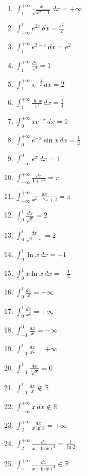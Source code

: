\documentclass[11pt,a4paper]{article}
\begin{document}
\begin{enumerate}
\item $\displaystyle \int_{1}^{+\infty} \frac{x}{\sqrt{x^{2} + 1}} \, dx = +\infty$
\item $\displaystyle \int_{-\infty}^{1} e^{2x} \, dx = \frac{e^{2}}{2}$
\item $\displaystyle \int_{1}^{+\infty} e^{3 - x} \, dx = e^{2}$
\item $\displaystyle \int_{1}^{+\infty} \frac{dx}{x^{2}} = 1$
\item $\displaystyle \int_{1}^{+\infty} x^{-\frac{3}{2}} \, dx = 2$
\item $\displaystyle \int_{1}^{+\infty} \frac{\ln x}{x^{3}} \, dx = \frac{1}{4}$
\item $\displaystyle \int_{0}^{+\infty} x e^{-x} \, dx = 1$
\item $\displaystyle \int_{0}^{+\infty} e^{-x} \sin x \, dx = \frac{1}{2}$
\item $\displaystyle \int_{-\infty}^{0} e^{x} \, dx = 1$
\item $\displaystyle \int_{-\infty}^{+\infty} \frac{dx}{1 + x^{2}} = \pi$
\item $\displaystyle \int_{-\infty}^{+\infty} \frac{dx}{x^{2} + 2x + 2} = \pi$
\item $\displaystyle \int_{0}^{1} \frac{dx}{\sqrt{x}} = 2$
\item $\displaystyle \int_{0}^{1} \frac{dx}{\sqrt{1 - x}} = 2$
\item $\displaystyle \int_{0}^{1} \ln x \, dx = -1$
\item $\displaystyle \int_{0}^{1} x \ln x \, dx = -\frac{1}{4}$
\item $\displaystyle \int_{0}^{1} \frac{dx}{x} = +\infty$
\item $\displaystyle \int_{0}^{1} \frac{dx}{x^{2}} = +\infty$
\item $\displaystyle \int_{-1}^{0} \frac{dx}{x} = -\infty$
\item $\displaystyle \int_{-1}^{1} \frac{dx}{x^{2}} = +\infty$
\item $\displaystyle \int_{-1}^{1} \frac{dx}{\sqrt[3]{x}} = 0$
\item $\displaystyle \int_{-1}^{1} \frac{dx}{x} \notin \mathbb{R}$
\item $\displaystyle \int_{-\infty}^{+\infty} x \, dx \notin \mathbb{R}$
\item $\displaystyle \int_{2}^{+\infty} \frac{dx}{x \ln x} = +\infty$
\item $\displaystyle \int_{2}^{+\infty} \frac{dx}{x (\ln x)^{2}} = \frac{1}{\ln 2}$
\item $\displaystyle \int_{e}^{+\infty} \frac{dx}{x (\ln x)^{2}} \in \mathbb{R}$

\end{enumerate}
\end{document}
